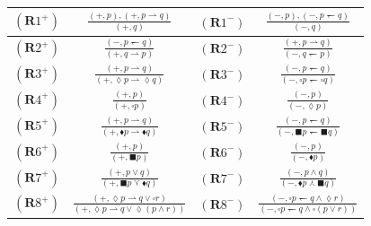 \documentclass[draft]{article}
\def\Rule{\mathbf{R}}
\begin{document}
\begin{table}[ht]
%
%
\begin{center}
%
%
\begin{tabular}{|c|c|c|c|}
%
%
\hline
%
%
$(\Rule1^{+})$&$\frac{(+,p),(+,p{\rightharpoonup}q)}{(+,q)}$&$(\Rule1^{-})$&$\frac{(-,p),(-,p{\leftharpoondown}q)}{(-,q)}$
%
%
\\
%
%
\hline
%
%
$(\Rule2^{+})$&$\frac{(-,p{\leftharpoondown}q)}{(+,q{\rightharpoonup}p)}$&$(\Rule2^{-})$&$\frac{(+,p{\rightharpoonup}q)}{(-,q{\leftharpoondown}p)}$
%
%
\\
%
%
\hline
%
%
$(\Rule3^{+})$&$\frac{(+,p{\rightharpoonup}q)}{(+,{\lozenge}p{\rightharpoonup}{\lozenge}q)}$&$(\Rule3^{-})$&$\frac{(-,p{\leftharpoondown}q)}{(-,{\square}p{\leftharpoondown}{\square}q)}$
%
%
\\
%
%
\hline
%
%
$(\Rule4^{+})$&$\frac{(+,p)}{(+,{\square}p)}$&$(\Rule4^{-})$&$\frac{(-,p)}{(-,{\lozenge}p)}$
%
%
\\
%
%
\hline
%
%
$(\Rule5^{+})$&$\frac{(+,p{\rightharpoonup}q)}{(+,{\blacklozenge}p{\rightharpoonup}{\blacklozenge}q)}$&$(\Rule5^{-})$&$\frac{(-,p{\leftharpoondown}q)}{(-,{\blacksquare}p{\leftharpoondown}{\blacksquare}q)}$
%
%
\\
%
%
\hline
%
%
$(\Rule6^{+})$&$\frac{(+,p)}{(+,{\blacksquare}p)}$&$(\Rule6^{-})$&$\frac{(-,p)}{(-,{\blacklozenge}p)}$
%
%
\\
%
%
\hline
%
%
$(\Rule7^{+})$&$\frac{(+,p{\vee}q)}{(+,{\blacksquare}p{\curlyvee}{\blacklozenge}q)}$&$(\Rule7^{-})$&$\frac{(-,p{\wedge}q)}{(-,{\blacklozenge}p{\curlywedge}{\blacksquare}q)}$
%
%
\\
%
%
\hline
%
%
$(\Rule8^{+})$&$\frac{(+,{\lozenge}p{\rightharpoonup}q{\vee}{\square}r)}{(+,{\lozenge}p{\rightharpoonup}q{\vee}{\lozenge}(p{\wedge}r))}$&$(\Rule8^{-})$&$\frac{(-,{\square}p{\leftharpoondown}q{\wedge}{\lozenge}r)}{(-,{\square}p{\leftharpoondown}q{\wedge}{\square}(p{\vee}r))}$
%
%
\\
%
%
\hline
%
%
%
%
%
%
%
%
%
%
%
%
%
%
%
%
%
%
%
%
%
%
%
%
%
%

\end{tabular}
\end{center}
\end{table}
\end{document}
